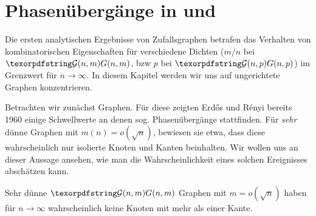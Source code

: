 \section{Phasenübergänge in \Gnp und \Gnm}
Die ersten analytischen Ergebnisse von Zufallsgraphen betrafen das Verhalten von kombinatorischen Eigenschaften für verschiedene Dichten (\dh $m/n$ bei $\Gnm$, bzw $p$ bei $\Gnp$) im Grenzwert für $n \to \infty$.
In  diesem Kapitel werden wir uns auf ungerichtete Graphen konzentrieren.

Betrachten wir zunächst \Gnm Graphen.
Für diese zeigten Erd\H{o}s und R\'enyi bereits 1960 einige Schwellwerte an denen sog. Phasenübergänge stattfinden.
Für \emph{sehr} dünne Graphen mit $m(n) = o(\sqrt n)$, bewiesen sie etwa, dass diese wahrscheinlich nur isolierte Knoten und Kanten beinhalten.
Wir wollen uns an dieser Aussage ansehen, wie man die Wahrscheinlichkeit eines solchen Ereignisses abschätzen kann.

\begin{lemma}
    Sehr dünne $\Gnm$ Graphen mit $m = o(\sqrt n)$ haben für $n \to \infty$ wahrscheinlich keine Knoten mit mehr als einer Kante.
\end{lemma}

